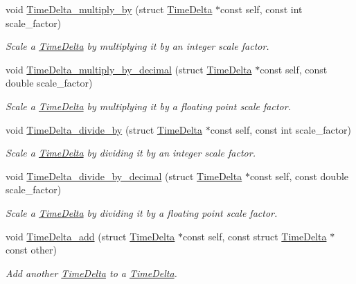 \begin{DoxyCompactItemize}
void \hyperlink{time-delta_8h_a772db85da3c67f149da8877ac8d04fad}{Time\-Delta\-\_\-multiply\-\_\-by} (struct \hyperlink{structTimeDelta}{Time\-Delta} $\ast$const self, const int scale\-\_\-factor)
\begin{DoxyCompactList}\small\item\em Scale a \hyperlink{structTimeDelta}{Time\-Delta} by multiplying it by an integer scale factor. \end{DoxyCompactList}\item 
void \hyperlink{time-delta_8h_a561fba60f8ba4648928fec8e18069ebb}{Time\-Delta\-\_\-multiply\-\_\-by\-\_\-decimal} (struct \hyperlink{structTimeDelta}{Time\-Delta} $\ast$const self, const double scale\-\_\-factor)
\begin{DoxyCompactList}\small\item\em Scale a \hyperlink{structTimeDelta}{Time\-Delta} by multiplying it by a floating point scale factor. \end{DoxyCompactList}\item 
void \hyperlink{time-delta_8h_abab39f5630f78511f708765da0be8632}{Time\-Delta\-\_\-divide\-\_\-by} (struct \hyperlink{structTimeDelta}{Time\-Delta} $\ast$const self, const int scale\-\_\-factor)
\begin{DoxyCompactList}\small\item\em Scale a \hyperlink{structTimeDelta}{Time\-Delta} by dividing it by an integer scale factor. \end{DoxyCompactList}\item 
void \hyperlink{time-delta_8h_acca21ee20d4addbd3925461259f4f12a}{Time\-Delta\-\_\-divide\-\_\-by\-\_\-decimal} (struct \hyperlink{structTimeDelta}{Time\-Delta} $\ast$const self, const double scale\-\_\-factor)
\begin{DoxyCompactList}\small\item\em Scale a \hyperlink{structTimeDelta}{Time\-Delta} by dividing it by a floating point scale factor. \end{DoxyCompactList}\item 
void \hyperlink{time-delta_8h_a388c9982a85d4f02741d4905fc8c3a1b}{Time\-Delta\-\_\-add} (struct \hyperlink{structTimeDelta}{Time\-Delta} $\ast$const self, const struct \hyperlink{structTimeDelta}{Time\-Delta} $\ast$const other)
\begin{DoxyCompactList}\small\item\em Add another \hyperlink{structTimeDelta}{Time\-Delta} to a \hyperlink{structTimeDelta}{Time\-Delta}. \end{DoxyCompactList}\item 

\end{DoxyCompactItemize}
